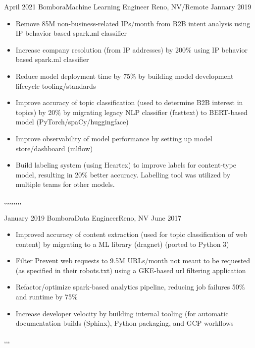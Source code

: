 \begin{experiences}
  \experience
    {April 2021}   {Bombora}{Machine Learning Engineer} {Reno, NV/Remote}
    {January 2019}
    {
      \begin{itemize}
        \item Remove 85M  non-business-related IPs/month from B2B intent analysis using IP behavior based spark.ml classifier
        \item Increase company resolution (from IP addresses) by 200\% using IP behavior based spark.ml classifier
        \item Reduce model deployment time by 75\% by building model development lifecycle tooling/standards
        \item Improve accuracy of topic classification (used to determine B2B interest in topics) by 20\% by migrating legacy NLP classifier (fasttext) to BERT-based model (PyTorch/spaCy/huggingface)
        \item Improve observability of model performance by setting up model store/dashboard (mlflow)
        \item  Build labeling system (using Heartex) to improve labels for content-type model, resulting in 20\% better accuracy. Labelling tool was utilized by multiple teams for other models.
      \end{itemize}
    }
    {\spark,\pubsub,\mlflow,\gke,\pytorch,\spacy,\huggingface,\heartex,\airflow,\dask}
  \emptySeparator

  \experience
    {January 2019} {Bombora}{Data Engineer}{Reno, NV}
    {June 2017}
    {
      \begin{itemize}
        \item Improved accuracy of content extraction (used for topic classification of web content) by migrating to a ML library (dragnet) (ported to Python 3)
        \item Filter Prevent web requests to 9.5M URLs/month not meant to be requested (as specified in their robots.txt) using a GKE-based url filtering application
        \item Refactor/optimize spark-based analytics pipeline, reducing job failures 50\% and runtime by 75\%
        \item Increase developer velocity by building internal tooling (for automatic documentation builds (Sphinx), Python packaging, and GCP workflows
      \end{itemize}
    }
    {\spark,\sphinx,\gke,\sklearn}
\end{experiences}

